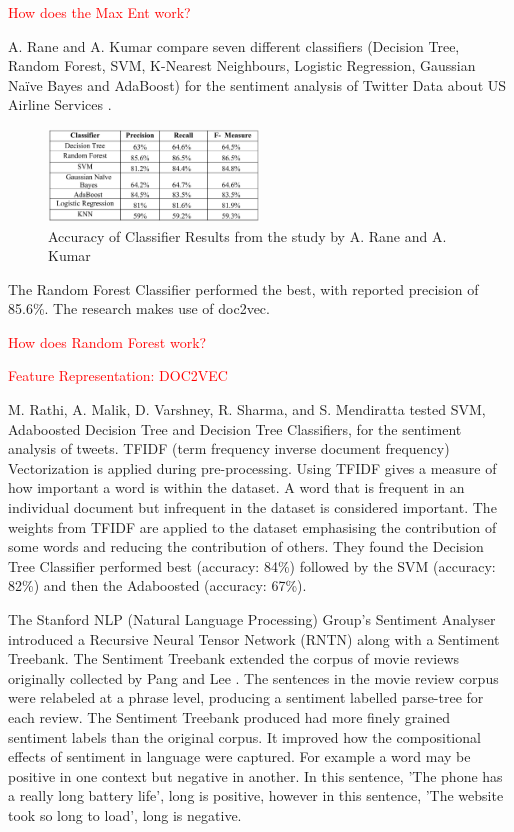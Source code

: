 \textcolor{red}{How does the Max Ent work?}

A. Rane and A. Kumar compare seven different classifiers (Decision Tree, Random Forest, SVM, K-Nearest Neighbours, Logistic Regression, Gaussian Naïve Bayes and AdaBoost) for the sentiment analysis of Twitter Data about US Airline Services \cite{Rane2018}. 
\begin{figure}
    \centering
    \includegraphics[width=0.5\textwidth]{literature_review/arane_classifier_results.PNG}
    \caption{Accuracy of Classifier Results from the study by A. Rane and A. Kumar \cite{Rane2018}}
\end{figure}
The Random Forest Classifier performed the best, with reported precision of 85.6\%. The research makes use of doc2vec.

\textcolor{red}{How does Random Forest work?}

\textcolor{red}{Feature Representation: DOC2VEC}

M. Rathi, A. Malik, D. Varshney, R. Sharma, and S. Mendiratta \cite{Raithi2018} tested SVM, Adaboosted Decision Tree and Decision Tree Classifiers, for the sentiment analysis of tweets. TFIDF (term frequency inverse document frequency) Vectorization is applied during pre-processing. Using TFIDF gives a measure of how important a word is within the dataset. A word that is frequent in an individual document but infrequent in the dataset is considered important. The weights from TFIDF are applied to the dataset emphasising the contribution of some words and reducing the contribution of others. They found the Decision Tree Classifier performed best  (accuracy: 84\%) followed by the SVM (accuracy: 82\%) and then the Adaboosted (accuracy: 67\%). 

The Stanford NLP (Natural Language Processing) Group's Sentiment Analyser \cite{stanfordSentiment2013} introduced a Recursive Neural Tensor Network (RNTN) along with a Sentiment Treebank. The Sentiment Treebank extended the corpus of movie reviews originally collected by Pang and Lee \cite{panglee2004}. The sentences in the movie review corpus were relabeled at a phrase level, producing a sentiment labelled parse-tree for each review. The Sentiment Treebank produced had more finely grained sentiment labels than the original corpus. It improved how the compositional effects of sentiment in language were captured. For example a word may be positive in one context but negative in another. In this sentence, 'The phone has a really long battery life', long is positive, however in this sentence, 'The website took so long to load', long is negative.

